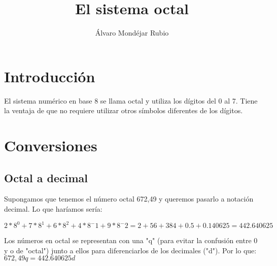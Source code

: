 \documentclass{article}
\title{El sistema octal}
\author{Álvaro Mondéjar Rubio}
\date{}
\begin{document}
\maketitle

\section{Introducción}
El sistema numérico en base 8 se llama octal y utiliza los dígitos del 0 al 7. Tiene la ventaja de que no requiere utilizar otros símbolos diferentes de los dígitos.

\section{Conversiones}
\subsection{Octal a decimal}
Supongamos que tenemos el número octal 672,49 y queremos pasarlo a notación decimal. Lo que haríamos sería:
\begin{center}
$2*8^0 + 7*8^1 + 6*8^2 + 4*8^-1 + 9*8^-2 = 2 + 56 + 384 + 0.5 + 0.140625 = 442.640625$
\end{center}

Los números en octal se representan con una "q" (para evitar la confusión entre 0 y o de "octal") junto a ellos para diferenciarlos de los decimales ("d"). Por lo que: $672,49q = 442.640625d$
\end{document}
